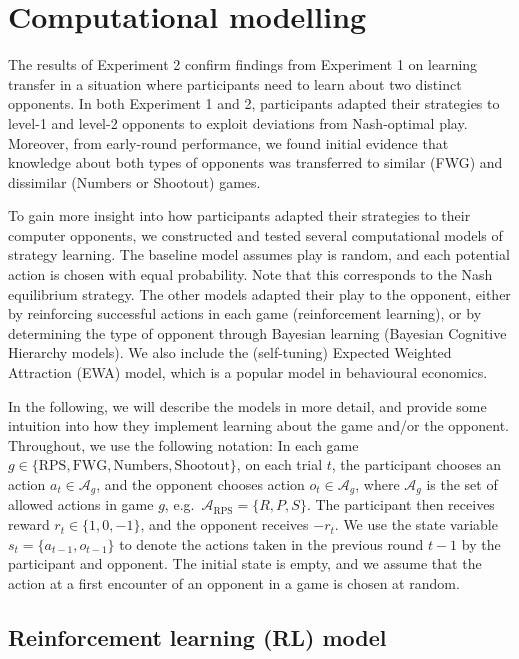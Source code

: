 \documentclass[smallextended]{svjour3}       %
\begin{document}
\hypertarget{computational-modelling}{%
\section{Computational modelling}\label{computational-modelling}}

The results of Experiment 2 confirm findings from Experiment 1 on
learning transfer in a situation where participants need to learn about
two distinct opponents. In both Experiment 1 and 2, participants adapted
their strategies to level-1 and level-2 opponents to exploit deviations
from Nash-optimal play. Moreover, from early-round performance, we found
initial evidence that knowledge about both types of opponents was
transferred to similar (FWG) and dissimilar (Numbers or Shootout) games.

To gain more insight into how participants adapted their strategies to
their computer opponents, we constructed and tested several
computational models of strategy learning. The baseline model assumes
play is random, and each potential action is chosen with equal
probability. Note that this corresponds to the Nash equilibrium
strategy. The other models adapted their play to the opponent, either by
reinforcing successful actions in each game (reinforcement learning), or
by determining the type of opponent through Bayesian learning (Bayesian
Cognitive Hierarchy models). We also include the (self-tuning) Expected
Weighted Attraction (EWA) model, which is a popular model in behavioural
economics.

In the following, we will describe the models in more detail, and
provide some intuition into how they implement learning about the game
and/or the opponent. Throughout, we use the following notation: In each
game
\(g \in \{\text{RPS},\text{FWG}, \text{Numbers}, \text{Shootout} \}\),
on each trial \(t\), the participant chooses an action
\(a_t \in \mathcal{A}_g\), and the opponent chooses action
\(o_t \in \mathcal{A}_g\), where \(\mathcal{A}_g\) is the set of allowed
actions in game \(g\), e.g.~\(\mathcal{A}_\text{RPS} = \{R,P,S\}\). The
participant then receives reward \(r_t \in \{1,0,-1\}\), and the
opponent receives \(-r_t\). We use the state variable
\(s_t = \{a_{t-1},o_{t-1}\}\) to denote the actions taken in the
previous round \(t-1\) by the participant and opponent. The initial
state is empty, and we assume that the action at a first encounter of an
opponent in a game is chosen at random.

\hypertarget{reinforcement-learning-rl-model}{%
\subsection{Reinforcement learning (RL)
model}\label{reinforcement-learning-rl-model}}
\end{document}
